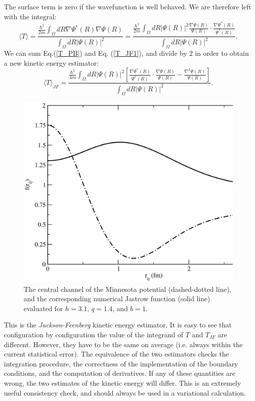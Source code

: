 The surface term is zero if the wavefunction is well behaved. We are therefore left with the integral:
\begin{equation}
\label{T_JF1}
\langle T\rangle = \frac{\displaystyle\frac{\hbar^2}{2m}\int_\Omega dR \nabla\Psi^*(R)\nabla\Psi(R)}{\displaystyle\int_\Omega dR |\Psi(R)|^2}= \frac{
	\displaystyle\frac{\hbar^2}{2m}\int_\Omega dR|\Psi(R)|^2 \frac{\nabla\Psi(R)}{\Psi(R)}\cdot
\frac{\nabla\Psi^*(R)}{\Psi^*(R)}
}{\displaystyle\int_\Omega dR |\Psi(R)|^2}.
\end{equation}
We can sum Eq.(\ref{T_PB}) and Eq. (\ref{T_JF1}), and divide by 2 in order to obtain a new kinetic energy estimator:
\begin{equation}
\langle T\rangle_{JF} = \frac{
	\displaystyle\frac{\hbar^2}{4m}\int_\Omega dR|\Psi(R)|^2 \left[\frac{\nabla\Psi^*(R)}{\Psi^*(R)}\cdot
	\frac{\nabla\Psi(R)}{\Psi(R)}-\frac{\nabla^2\Psi(R)}{\Psi(R)}\right]
}{\displaystyle\int_\Omega dR |\Psi(R)|^2}.
\end{equation}
\begin{figure}
	\begin{center}
		\includegraphics[scale=0.5]{Chapter9-figures/jas.eps}
	\end{center}
	\caption{The central channel of the Minnesota potential (dashed-dotted line), and the corresponding numerical Jastrow function (solid line) evaluated for $h=3.1$, $q=1.4$, and $b=1$.}
	\label{fig.var}
\end{figure}
This is the {\it Jackson-Feenberg} kinetic energy estimator. It is easy to see that configuration by configuration the value of the integrand of $T$ and $T_{JF}$ are different. However, they have to be the same on average (i.e. always within the current statistical error). The equivalence of the two estimators checks the integration procedure, the correctness of the implementation of the boundary conditions, and the computation of derivatives. If any of these quantities are wrong, the two estimates of the kinetic energy will differ. This is an extremely useful consistency check, and should always be used in a variational calculation.

